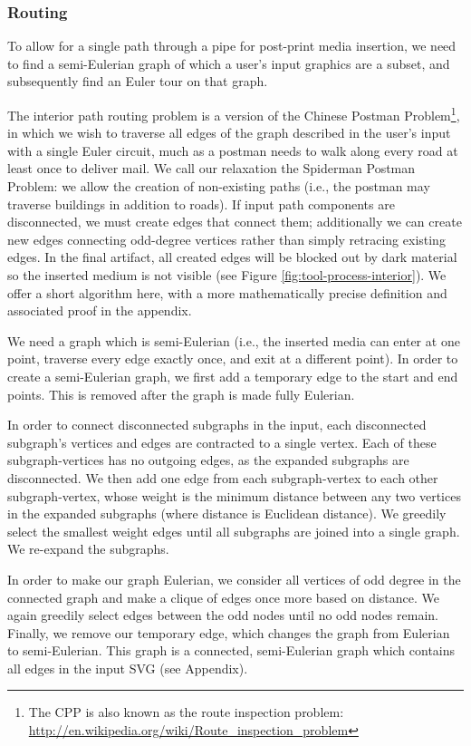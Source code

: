 \subsubsection{Routing}
To allow for a single path through a pipe for post-print media insertion, we need to find a semi-Eulerian graph of which a user's input graphics are a subset, and subsequently find an Euler tour on that graph.

The interior path routing problem is a version of the Chinese Postman Problem\footnote{The CPP is also known as the route inspection problem: \url{http://en.wikipedia.org/wiki/Route_inspection_problem}}, in which we wish to traverse all edges of the graph described in the user's input with a single Euler circuit, much as a postman needs to walk along every road at least once to deliver mail.  We call our relaxation the Spiderman Postman Problem: we allow the creation of non-existing paths (i.e., the postman may traverse buildings in addition to roads).  If input path components are disconnected, we must create edges that connect them; additionally we can create new edges connecting odd-degree vertices rather than simply retracing existing edges.  In the final artifact, all created edges will be blocked out by dark material so the inserted medium is not visible (see Figure \ref{fig:tool-process-interior}).  We offer a short algorithm here, with a more mathematically precise definition and associated proof in the appendix.

We need a graph which is semi-Eulerian (i.e., the inserted media can enter at one point, traverse every edge exactly once, and exit at a different point).  In order to create a semi-Eulerian graph, we first add a temporary edge to the start and end points.  This is removed after the graph is made fully Eulerian.

In order to connect disconnected subgraphs in the input, each disconnected subgraph's vertices and edges are contracted to a single vertex.  Each of these subgraph-vertices has no outgoing edges, as the expanded subgraphs are disconnected.  We then add one edge from each subgraph-vertex to each other subgraph-vertex, whose weight is the minimum distance between any two vertices in the expanded subgraphs (where distance is Euclidean distance).  We greedily select the smallest weight edges until all subgraphs are joined into a single graph.  We re-expand the subgraphs.

In order to make our graph Eulerian, we consider all vertices of odd degree in the connected graph and make a clique of edges once more based on distance.  We again greedily select edges between the odd nodes until no odd nodes remain.  Finally, we remove our temporary edge, which changes the graph from Eulerian to semi-Eulerian.  This graph is a connected, semi-Eulerian graph which contains all edges in the input SVG (see Appendix).

